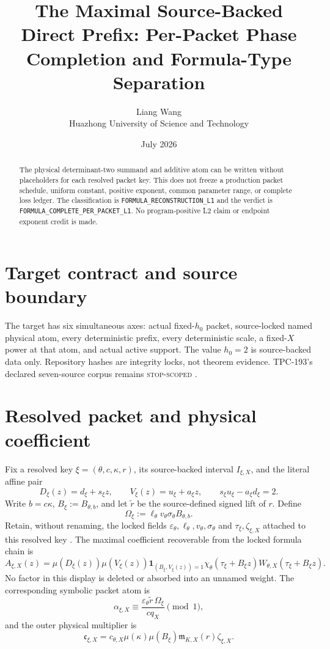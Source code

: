 \documentclass[11pt]{article}
\title{\textbf{The Maximal Source-Backed Direct Prefix: Per-Packet Phase Completion and Formula-Type Separation}}
\author{Liang Wang\\Huazhong University of Science and Technology}
\date{July 2026}
\begin{document}
\maketitle
\begin{abstract}
The physical determinant-two summand and additive atom can be written without placeholders for each resolved packet key.  This does not freeze a production packet schedule, uniform constant, positive exponent, common parameter range, or complete loss ledger.
The classification is \texttt{FORMULA\_\allowbreak{}RECONSTRUCTION\_\allowbreak{}L1} and the
verdict is \texttt{FORMULA\_\allowbreak{}COMPLETE\_\allowbreak{}PER\_\allowbreak{}PACKET\_\allowbreak{}L1}.  No program-positive L2
claim or endpoint exponent credit is made.
\end{abstract}

\section{Target contract and source boundary}
The target has six simultaneous axes: actual fixed-\(h_0\) packet,
source-locked named physical atom, every deterministic prefix, every
deterministic scale, a fixed-\(X\) power at that atom, and actual active
support.  The value \(h_0=2\) is source-backed data only.  Repository hashes
are integrity locks, not theorem evidence.  TPC-193's declared seven-source
corpus remains \textsc{stop-scoped} \citep{WangTPC193}.


\section{Resolved packet and physical coefficient}
Fix a resolved key
\(\xi=(\theta,c,\kappa,r)\), its source-backed interval
\(I_{\xi,X}\), and the literal affine pair
\[
 D_\xi(z)=d_\xi+s_\xi z,\qquad
 V_\xi(z)=u_\xi+a_\xi z,\qquad
 s_\xi u_\xi-a_\xi d_\xi=2.
\]
Write \(b=c\kappa\), \(B_\xi:=B_{\theta,b}\), and let
\(\widetilde r\) be the source-defined signed lift of \(r\).  Define
\[
\Omega_\xi:=\ell_\theta v_\theta\sigma_\theta B_{\theta,b}.
\]
Retain, without renaming, the locked fields
\(\varepsilon_\theta,\ell_\theta,v_\theta,\sigma_\theta\) and
\(\tau_\xi,\zeta_{\xi,X}\) attached to this resolved key
\citep{WangTPC93,WangTPC94,WangTPC108,WangTPC127}.
The maximal coefficient recoverable from the locked formula chain is
\[
 A_{\xi,X}(z)=
 \mu(D_\xi(z))\mu(V_\xi(z))
 \mathbf 1_{(B_\xi,V_\xi(z))=1}
 \chi_\theta(\tau_\xi+B_\xi z)
 W_{\theta,X}(\tau_\xi+B_\xi z).
\]
No factor in this display is deleted or absorbed into an unnamed weight.
The corresponding symbolic packet atom is
\[
 \alpha_{\xi,X}\equiv
 \frac{\varepsilon_\theta\widetilde r\,\Omega_\xi}{c q_X}\pmod 1,
\]
and the outer physical multiplier is
\[
 \mathfrak c_{\xi,X}
 =c_{\theta,X}\mu(\kappa)\mu(B_\xi)
  \mathfrak m_{K,X}(r)\zeta_{\xi,X}.
\]
\end{document}
